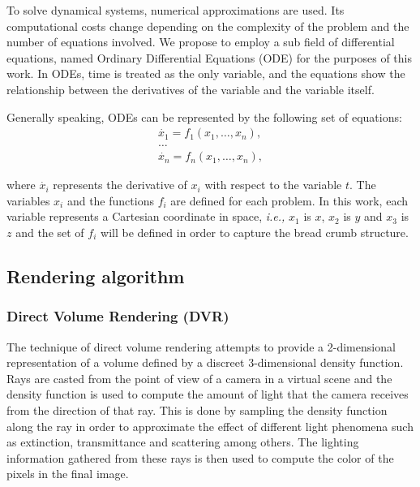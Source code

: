 \documentclass[oneside,a4paper,english,links]{amca}
\begin{document}
To solve dynamical systems, numerical approximations are used. Its computational costs change depending on the complexity of the problem and the number of equations involved. We propose to employ a sub field of differential equations, named Ordinary Differential Equations (ODE) for the purposes of this work. In ODEs, time is treated as the only variable, and the equations show the relationship between the derivatives of the variable and the variable itself. 

Generally speaking, ODEs can be represented by the following set of equations:
\begin{equation} \label{eq:simple}  
  \begin{aligned}
    \dot{x_{1}} = f_{1}(x_{1},\ldots,x_{n}),\\
    \ldots\\
    \dot{x_{n}} = f_{n}(x_{1},\ldots,x_{n}),
  \end{aligned}
\end{equation}

where $\dot{x_{i}}$ represents the derivative of $x_{i}$ with respect to the variable $t$. The variables $x_{i}$ and the functions $f_{i}$ are defined for each problem. In this work, each variable represents a Cartesian coordinate in space, {\em i.e.,} $x_{1}$ is $x$, $x_{2}$ is $y$ and $x_{3}$ is $z$ and the set of $f_{i}$ will be defined in order to capture the bread crumb structure.


\subsection{Rendering algorithm}

\subsubsection{Direct Volume Rendering (DVR)}

The technique of direct volume rendering attempts to provide a
2-dimensional representation of a volume defined by a discreet
3-dimensional density function. Rays are casted from the point of view
of a camera in a virtual scene and the density function is used to
compute the amount of light that the camera receives from the
direction of that ray. This is done by sampling the density function
along the ray in order to approximate the effect of different light
phenomena such as extinction, transmittance and scattering among
others. The lighting information gathered from these rays is then
used to compute the color of the pixels in the final image.
\end{document}
